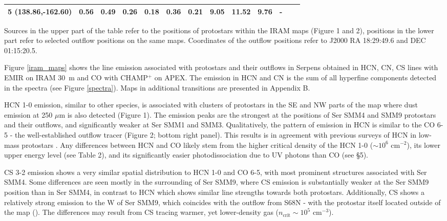 \documentclass{aa}
\begin{document}
\begin{table*}
\begin{tabular}{l c c c c c c c c c c c c }
5 (138.86,-162.60) & 0.56 & 0.49 & 0.26 & 0.18 & 0.36 & 0.21 & 9.05 & 11.52 & 9.76 & - \\ 
\hline \end{tabular} 
\begin{flushleft} Sources in the upper part of the table refer to the positions of protostars
 within the IRAM maps (Figure 1 and 2), positions in the lower part refer to selected
outflow positions on the same maps. Coordinates of the outflow positions refer to J2000 RA 
18:29:49.6 and DEC 01:15:20.5. \\
\end{flushleft} 
\end{table*}
Figure \ref{iram_maps} shows the line emission associated with protostars and their outflows in 
Serpens obtained in HCN, CN, CS lines with EMIR on IRAM 30~m and CO with CHAMP$^+$ on APEX. 
The emission in HCN and CN is the sum of all hyperfine components detected in the spectra 
(see Figure \ref{spectra}). Maps in additional transitions are presented in Appendix B.

HCN 1-0 emission, similar to other species, is associated with clusters of protostars 
in the SE and NW parts of the map where dust emission at 250 $\mu$m is also detected (Figure 1). 
The emission peaks are the strongest at the positions of Ser SMM4 and SMM9 protostars and their outflows,
and significantly weaker at Ser SMM1 and SMM3. Qualitatively, the pattern of emission in
 HCN is similar to the CO 6-5 - the well-established outflow tracer (Figure 2; bottom right panel). 
 This results is in agreement with previous surveys of HCN in low-mass protostars \citep{Bac01,Wal14}.
 Any differences between HCN and CO likely stem from the higher critical density of the 
 HCN 1-0 ($\sim10^6$ cm$^{-2}$), its lower upper energy level (see Table 2), and its 
 significantly easier photodissociation due to UV photons than CO (see \S 5). 

CS 3-2 emission shows a very similar spatial distribution to HCN 1-0 and CO 6-5, with most 
prominent structures associated with Ser SMM4. Some differences are seen mostly in the 
surrounding of Ser SMM9, where CS emission is substantially weaker at the Ser SMM9 position 
than in Ser SMM4, in contrast to HCN which shows similar line strengths towards both protostars. 
Additionally, CS shows a relatively strong emission to the W of Ser SMM9, which coincides 
with the outflow from S68N - with the protostar itself located outside of the map (\citealt{Kri10}).
The differences may result from CS tracing warmer, yet lower-density gas ($n_\mathrm{crit}\sim 10^5$ cm$^{-3}$).
\end{document}
